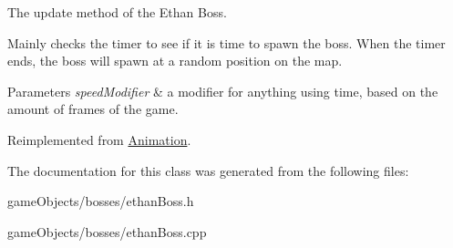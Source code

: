 The update method of the Ethan Boss. 

Mainly checks the timer to see if it is time to spawn the boss. When the timer ends, the boss will spawn at a random position on the map. 
\begin{DoxyParams}{Parameters}
{\em speed\+Modifier} & a modifier for anything using time, based on the amount of frames of the game. \\
\hline
\end{DoxyParams}


Reimplemented from \hyperlink{class_animation_ae17ebf5f4b47801e460eb63342d858e8}{Animation}.



The documentation for this class was generated from the following files\+:\begin{DoxyCompactItemize}
\item 
game\+Objects/bosses/ethan\+Boss.\+h\item 
game\+Objects/bosses/ethan\+Boss.\+cpp\end{DoxyCompactItemize}
